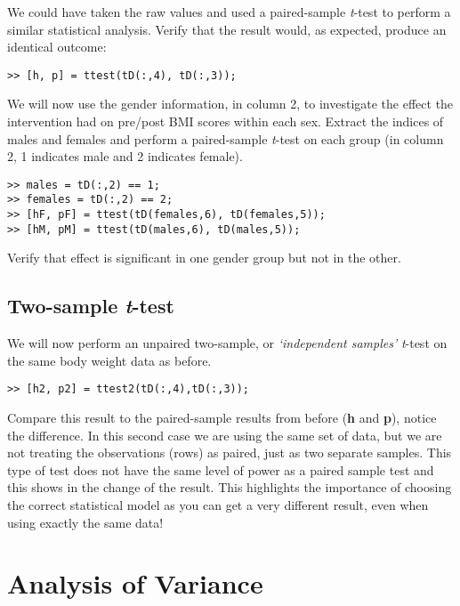 \documentclass[12pt,a4paper]{article}
\begin{document}
We could have taken the raw values and used a paired-sample \emph{t}-test to perform a similar statistical analysis.  
Verify that the result would, as expected, produce an identical outcome:
\begin{lstlisting}[style=Matlab-editor]
>> [h, p] = ttest(tD(:,4), tD(:,3));
\end{lstlisting}
We will now use the gender information, in column 2, to investigate the effect the intervention had on pre/post BMI scores within each sex.  
Extract the indices of males and females and perform a paired-sample \emph{t}-test on each group (in column 2, 1 indicates male and 2 indicates female).
\begin{lstlisting}[style=Matlab-editor]
>> males = tD(:,2) == 1;
>> females = tD(:,2) == 2;	
>> [hF, pF] = ttest(tD(females,6), tD(females,5));
>> [hM, pM] = ttest(tD(males,6), tD(males,5));
\end{lstlisting}
Verify that effect is significant in one gender group but not in the other.  

\subsection{Two-sample \emph{t}-test}
We will now perform an unpaired two-sample, or \emph{`independent samples'} \emph{t}-test on the same body weight data as before.
\begin{lstlisting}[style=Matlab-editor]		
>> [h2, p2] = ttest2(tD(:,4),tD(:,3));
\end{lstlisting}
Compare this result to the paired-sample results from before (\textbf{h} and \textbf{p}), notice the difference.  
In this second case we are using the same set of data, but we are not treating the observations (rows) as paired, just as two separate samples.  
This type of test does not have the same level of power as a paired sample test and this shows in the change of the result.  
This highlights the importance of choosing the correct statistical model as you can get a very different result, even when using exactly the same data!

\section{Analysis of Variance}
\end{document}
